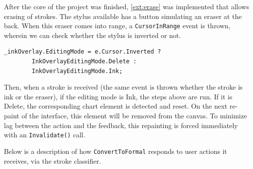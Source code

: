 	After the core of the project was finished, \ref{ext:erase} was implemented that allows erasing of strokes. The stylus available has a button simulating an eraser at the back. When this eraser comes into range, a \texttt{CursorInRange} event is thrown, wherein we can check whether the stylus is inverted or not.
	
	\begin{lstlisting}[frame=single]
_inkOverlay.EditingMode = e.Cursor.Inverted ? 
		InkOverlayEditingMode.Delete : 
		InkOverlayEditingMode.Ink;
	\end{lstlisting}
	
	Then, when a stroke is received (the same event is thrown whether the stroke is ink or the eraser), if the editing mode is Ink, the steps above are run. If it is Delete, the corresponding chart element is detected and reset. On the next re-paint of the interface, this element will be removed from the canvas. To minimize lag between the action and the feedback, this repainting is forced immediately with an \texttt{Invalidate()} call.
	
	 Below is a description of how \texttt{ConvertToFormal} responds to user actions it receives, via the stroke classifier. 
	
